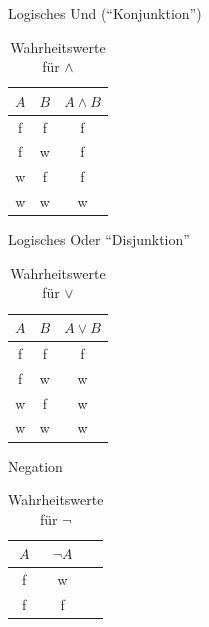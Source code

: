 \documentclass[18pt]{beamer}
\begin{document}
    \begin{frame}{Logisches Und ("`Konjunktion"')}
        \begin{table}
            \caption{Wahrheitswerte für $\wedge$}
            \begin{center}
                \begin{tabular}{ccc}
                    \toprule
                    $A$ & $B$ & $A \wedge B$\\
                    \midrule
                    f & f & f\\
                    f & w & f\\
                    w & f & f\\
                    w & w & w\\
                    \bottomrule
                \end{tabular}
             \end{center}
        \end{table}
    \end{frame}

    \begin{frame}{Logisches Oder "`Disjunktion"'}
        \begin{table}
            \caption{Wahrheitswerte für $\vee$}
            \begin{center}
                \begin{tabular}{ccc}
                    \toprule
                    $A$ & $B$ & $A \vee B$\\
                    \midrule
                    f & f & f\\
                    f & w & w\\
                    w & f & w\\
                    w & w & w\\
                    \bottomrule
                \end{tabular}
             \end{center}
        \end{table}
    \end{frame}

    \begin{frame}{Negation}
        \begin{table}
            \caption{Wahrheitswerte für $\neg$}
            \begin{center}
                \begin{tabular}{ccc}
                    \toprule
                    $A$ & $ \neg A$\\
                    \midrule
                    f & w\\
                    f & f\\
                    \bottomrule
                \end{tabular}
             \end{center}
        \end{table}
    \end{frame}
\end{document}
